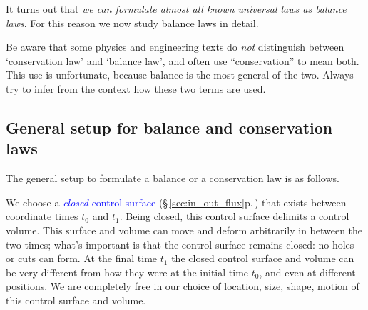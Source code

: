 \documentclass[a4paper,12pt,%
onecolumn,oneside,%
british%
]{memoir}
\renewcommand*{\|}[1][]{\nonscript\:#1\vert\nonscript\:\mathopen{}}
\newcommand*{\sect}{\S}%
\renewcommand*{\autoref}[3][\sect\,\ref]{\textcolor{blue}{#3} {\color{blue}\scriptsize(\faIcon[regular]{eye}\;#1{#2}\;p.\,\pageref{#2})}}
\newcommand*{\yti}{t_{0}}
\newcommand*{\ytf}{t_{1}}
\begin{document}
It turns out that \emph{we can formulate almost all known universal laws as balance laws}. For this reason we now study balance laws in detail.


\begin{warning}[\enquote*{Conservation} vs \enquote*{balance} in other texts,label={wa:conservation}]
  Be aware that some physics and engineering texts do \emph{not} distinguish between \enquote*{conservation law} and \enquote*{balance law}, and often use \enquote{conservation} to mean both. This use is unfortunate, because balance is the most general of the two. Always try to infer from the context how these two terms are used.
\end{warning}

\subsection{General setup for balance and conservation laws}
\label{sec:balance_setup}

The general setup to formulate a balance or a conservation law is as follows.

We choose a \autoref{sec:in_out_flux}{\emph{closed} control surface} that exists between coordinate times $\yti$ and $\ytf$. Being closed, this control surface delimits a control volume. This surface and volume can move and deform arbitrarily in between the two times; what's important is that the control surface remains closed: no holes or cuts can form. At the final time $\ytf$ the closed control surface and volume can be very different from how they were at the initial time $\yti$, and even at different positions. We are completely free in our choice of location, size, shape, motion of this control surface and volume.
\end{document}
